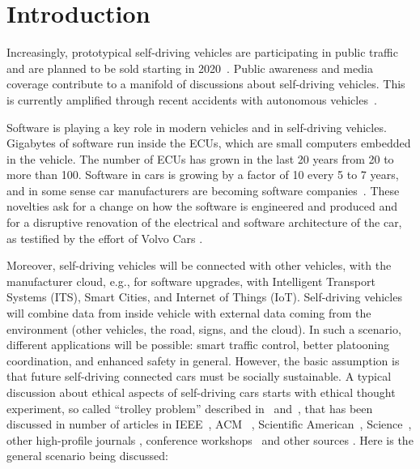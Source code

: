 \section{Introduction}


Increasingly, prototypical self-driving vehicles are participating in public traffic~\cite{Persson2014} and are planned to be sold starting in 2020~\cite{Toyota2015,Stoll_WSJ_2016}. Public awareness and media coverage contribute to a manifold of discussions about self-driving vehicles. This is currently amplified through recent accidents with autonomous vehicles~\cite{Tesla2016_tragicloss,Dolgov2016}. 

Software is playing a key role in modern vehicles and in self-driving vehicles. Gigabytes of software run inside the \acp{ECU}, which are small computers embedded in the vehicle. The number of \acp{ECU} has grown in the last 20 years from 20 to more than 100. Software in cars is growing by a factor of 10 every 5 to 7 years, and in some sense car manufacturers are becoming software companies~\cite{PELLICCIONE201783}. These novelties ask for a change on how the software is engineered and produced and for a disruptive renovation of the electrical and software architecture of the car, as testified by the effort of Volvo Cars \cite{PELLICCIONE201783}.

Moreover, self-driving vehicles will be connected with other vehicles, with the manufacturer cloud, e.g., for software upgrades, with Intelligent Transport Systems (ITS), Smart Cities, and Internet of Things (IoT). Self-driving vehicles will combine data from inside vehicle with external data coming from the environment (other vehicles, the road, signs, and the cloud). In such a scenario, different applications will be possible: smart traffic control, better platooning coordination, and enhanced safety in general.
However, the basic assumption is that future self-driving connected cars must be socially sustainable.
A typical discussion about ethical aspects of self-driving cars starts with ethical thought experiment, so called \enquote{trolley problem} described in~\cite{Foot1967} and~\cite{Wintersberger2017}, that has been discussed in number of articles in IEEE~\cite{7948873,Goodall2016,Ackerman2016}, ACM~ \cite{McBride:2016:EDC:2874239.2874265,Kirkpatrick:2015:MCD:2808213.2788477,Frison:2016:FPT:3004323.3004336}, Scientific American~\cite{Greenemeier2016,Deamer2016,Kuchinskas2013}, Science~\cite{Bonnefon2016,Greene2016_1514}, other high-profile journals \cite{2016arXiv160608813G_GoodmanFlaxman, Coca-Vila2017, goodall2014vehicle}, conference workshops~\cite{Riener:2016:WEI:3004323.3005687,Alavi:2017:DCW:3064857.3079155} and other sources \cite{MoralMachine2016,Mooney2016,Achenbach2015,Shashkevich2017}. Here is the general scenario being discussed:

